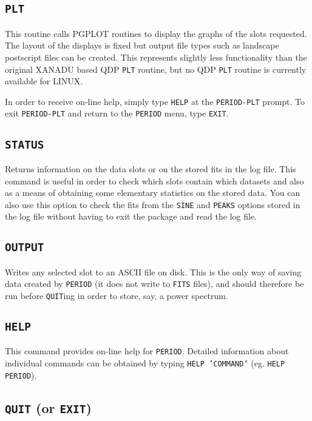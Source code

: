 \documentclass[twoside,11pt,noabs,nolof]{starlink}
\begin{document}
\subsection*{\texttt{PLT}}

This routine calls PGPLOT routines to display the graphs of the slots
requested. The layout of the displays is fixed but output file
types such as landscape postscript files can be created. This
represents slightly less functionality than the original XANADU based
QDP \texttt{PLT} routine, but no QDP \texttt{PLT} routine is currently available for
LINUX.

In order
to receive on-line help, simply type \texttt{HELP} at the \texttt{PERIOD-PLT}
prompt. To exit \texttt{PERIOD-PLT} and return to the \texttt{PERIOD} menu,
type \texttt{EXIT}.

\subsection*{\texttt{STATUS}}

Returns information on the data slots or on the stored fits in the log file.
This command is useful in order to check which slots contain which datasets
and also as a means of obtaining some elementary statistics on the stored data.
You can also use this option to check the fits from the \texttt{SINE} and
\texttt{PEAKS} options stored in the log file without having to exit the package
and read the log file.

\subsection*{\texttt{OUTPUT}}

Writes any selected slot to an ASCII file on disk. This is the only way of
saving data created by \texttt{PERIOD} (it does not write to \texttt{FITS} files),
and should therefore be run before \texttt{QUIT}ing in order to store, say,
a power spectrum.

\subsection*{\texttt{HELP}}

This command provides on-line help for \texttt{PERIOD}. Detailed information about
individual commands can be obtained by typing \texttt{HELP 'COMMAND'} (eg. \texttt{HELP PERIOD}).

\subsection*{\texttt{QUIT} (or \texttt{EXIT})}
\end{document}
